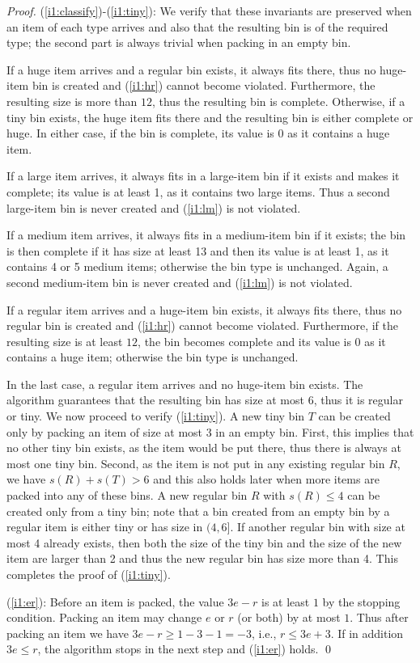 \begin{proof}
(\ref{i1:classify})-(\ref{i1:tiny}): We verify that these invariants
  are preserved when an item of each type arrives and also that the
  resulting bin is of the required type; the second part is always
  trivial when packing in an empty bin.

If a huge item arrives and a regular bin exists, it always fits there,
thus no huge-item bin is created and (\ref{i1:hr}) cannot become
violated. Furthermore, the resulting size is more than $12$, thus the
resulting bin is complete. Otherwise, if a tiny bin exists, the huge
item fits there and the resulting bin is either complete or huge. In
either case, if the bin is complete, its value is 0 as it contains a
huge item.

If a large item arrives, it always fits in a large-item bin if it
exists and makes it complete; its value is at least 1, as it contains
two large items. Thus a second large-item bin is never
created and (\ref{i1:lm}) is not violated.

If a medium item arrives, it always fits in a medium-item bin if it
exists; the bin is then complete if it has size at least 13 and then
its value is at least 1, as it contains 4 or 5 medium items; otherwise
the bin type is unchanged. Again, a second medium-item bin is never
created and (\ref{i1:lm}) is not violated.

If a regular item arrives and a huge-item bin exists, it always fits
there, thus no regular bin is created and (\ref{i1:hr}) cannot become
violated. Furthermore, if the resulting size is at least $12$, the bin
becomes complete and its value is 0 as it contains a huge item; otherwise
the bin type is unchanged.

In the last case, a regular item arrives and no huge-item bin exists.
The algorithm guarantees that the resulting bin has size at most 6,
thus it is regular or tiny. We now proceed to verify
(\ref{i1:tiny}). A new tiny bin $T$ can be created only by packing an
item of size at most 3 in an empty bin. First, this implies that no
other tiny bin exists, as the item would be put there, thus there is
always at most one tiny bin. Second, as the item is not put in any
existing regular bin $R$, we have $s(R)+s(T)>6$ and this also holds
later when more items are packed into any of these bins. A new regular
bin $R$ with $s(R)\leq 4$ can be created only from a tiny bin; note
that a bin created from an empty bin by a regular item is either tiny
or has size in $(4,6]$. If another regular bin with size at most 4
  already exists, then both the size of the tiny bin and the size of
  the new item are larger than 2 and thus the new regular bin has size
  more than 4. This completes the proof of (\ref{i1:tiny}). 

(\ref{i1:er}): Before an item is packed, the value $3e-r$ is at least
  $1$ by the stopping condition. Packing an item may change $e$ or $r$ (or both) by at most $1$. Thus after
  packing an item we have $3e-r\geq 1-3-1=-3$, i.e., $r\leq 3e+3$. If
  in addition $3e\leq r$, the algorithm stops in the next step and
  (\ref{i1:er}) holds.  \qed
\end{proof}

